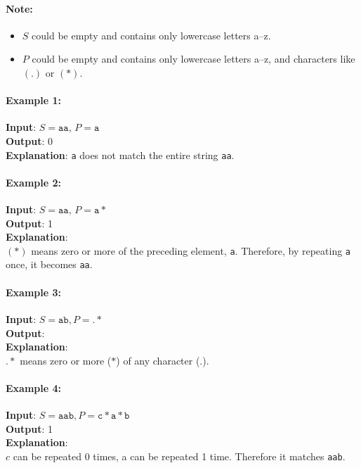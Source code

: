 \paragraph{Note:}
\begin{itemize}
\item $S$ could be empty and contains only lowercase letters a--z.
\item $P$ could be empty and contains only lowercase letters a--z, and characters like $(.)$ or $(\ast)$.
\end{itemize}
\paragraph{Example 1:}
\begin{flushleft}
\textbf{Input}: $S=\texttt{aa}$, $P=\texttt{a}$
\\
\textbf{Output}: 0
\\
\textbf{Explanation}: \texttt{a} does not match the entire string \texttt{aa}.
\end{flushleft}
\paragraph{Example 2:}
\begin{flushleft}
\textbf{Input}: $S=\texttt{aa}$, $P=\texttt{a}\ast$
\\
\textbf{Output}: 1
\\
\textbf{Explanation}:
\\
$(\ast)$ means zero or more of the preceding element, \texttt{a}. Therefore, by repeating \texttt{a} once, it becomes \texttt{aa}.
\end{flushleft}
\paragraph{Example 3:}
\begin{flushleft}
\textbf{Input}: $S=\texttt{ab}, P=.\ast$
\\
\textbf{Output}:
\\
\textbf{Explanation}:
\\
$.\ast$ means zero or more ($\ast$) of any character ($.$).
\end{flushleft}
\paragraph{Example 4:}
\begin{flushleft}
\textbf{Input}: $S = \texttt{aab}, P = \texttt{c}\ast\texttt{a}\ast\texttt{b}$
\\
\textbf{Output}: 1
\\
\textbf{Explanation}:
\\
$c$ can be repeated 0 times, a can be repeated 1 time. Therefore it matches \texttt{aab}.
\end{flushleft}
